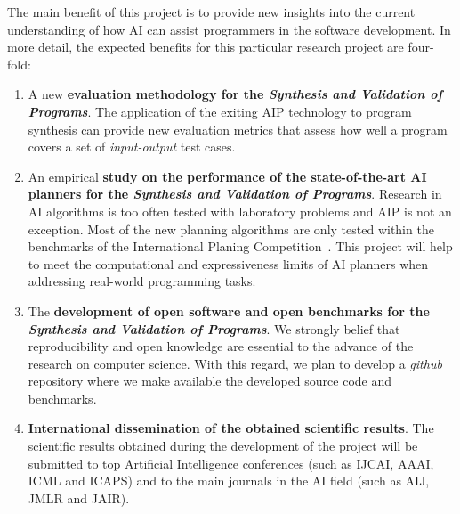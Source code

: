 \documentclass[10pt,a4paper]{paper}
\begin{document}
The main benefit of this project is to provide new insights into the current understanding of how AI can assist programmers in the software development. In more detail, the expected benefits for this particular research project are four-fold:
\begin{enumerate}
\item A new {\bf evaluation methodology for the {\em Synthesis and Validation of Programs}}. The application of the exiting AIP technology to program synthesis can provide new evaluation metrics that assess how well a program covers a set of {\em input-output} test cases.  
\item An empirical {\bf study on the performance of the state-of-the-art AI planners for the {\em Synthesis and Validation of Programs}}. Research in AI algorithms is too often tested with laboratory problems and AIP is not an exception. Most of the new planning algorithms are only tested within the benchmarks of the International Planing Competition~\cite{vallati:IPC:AI15}. This project will help to meet the computational and expressiveness limits of AI planners when addressing real-world programming tasks. 
\item The {\bf development of open software and open benchmarks for the {\em Synthesis and Validation of Programs}}. We strongly belief that reproducibility and open knowledge are essential to the advance of the research on computer science. With this regard, we plan to develop a {\em github} repository where we make available the developed source code and benchmarks.
\item {\bf International dissemination of the obtained scientific results}. The scientific results obtained during the development of the project will be submitted to top Artificial Intelligence conferences (such as IJCAI, AAAI, ICML and ICAPS) and to the main journals in the AI field (such as AIJ, JMLR and JAIR).
\end{enumerate}

\vspace{0.3cm}


\begin{scriptsize}

\end{scriptsize}

\end{document}

